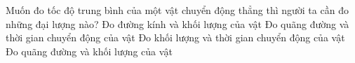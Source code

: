 \begin{ex}%
Muốn đo tốc độ trung bình của một vật chuyển động thẳng thì người ta cần đo những đại lượng nào?
\choice
{Đo đường kính và khối lượng của vật}
{\True Đo quãng đường và thời gian chuyển động của vật}
{Đo khối lượng và thời gian chuyển động của vật}
{Đo quãng đường và khối lượng của vật}
\loigiai{

}
 \end{ex}













































